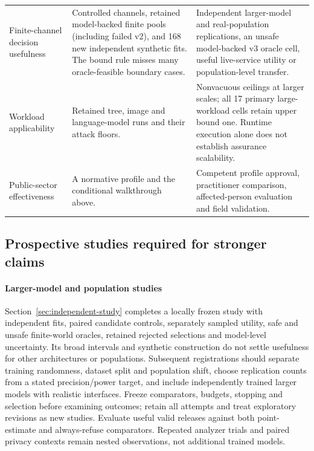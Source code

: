 \begin{table}[t]
\begin{tabularx}{\textwidth}{@{}p{}XX@{}}
Finite-channel decision usefulness & Controlled channels, retained model-backed finite pools (including failed v2), and 168 new independent synthetic fits. The bound rule misses many oracle-feasible boundary cases. & Independent larger-model and real-population replications, an unsafe model-backed v3 oracle cell, useful live-service utility or population-level transfer. \\
Workload applicability & Retained tree, image and language-model runs and their attack floors. & Nonvacuous ceilings at larger scales; all 17 primary large-workload cells retain upper bound one. Runtime execution alone does not establish assurance scalability. \\
Public-sector effectiveness & A normative profile and the conditional walkthrough above. & Competent profile approval, practitioner comparison, affected-person evaluation and field validation. \\
\bottomrule
\end{tabularx}
\end{table}

\subsection{Prospective studies required for stronger claims}
\paragraph{Larger-model and population studies}
Section~\ref{sec:independent-study} completes a locally frozen study with
independent fits, paired candidate controls, separately sampled utility,
safe and unsafe finite-world oracles, retained rejected selections and
model-level uncertainty. Its broad intervals and synthetic construction do
not settle usefulness for other architectures or populations. Subsequent
registrations should separate training randomness, dataset split and
population shift, choose replication counts from a stated precision/power
target, and include independently trained larger models with realistic
interfaces. Freeze comparators, budgets, stopping and selection before
examining outcomes; retain all attempts and treat exploratory revisions as
new studies. Evaluate useful valid releases against both point-estimate and
always-refuse comparators. Repeated analyzer trials and paired privacy contexts
remain nested observations, not additional trained models.

